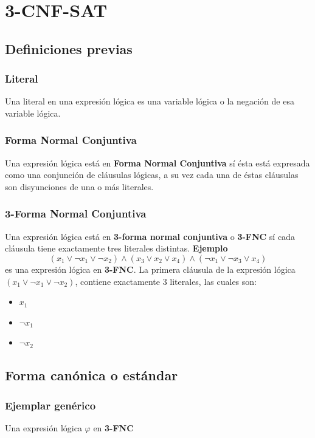 \documentclass[a4paper]{article}
\begin{document}
\section{3-CNF-SAT}
\subsection{Definiciones previas}
\subsubsection{Literal}
\noindent
Una literal en una expresión lógica es una variable lógica o la negación de esa variable lógica.
\subsubsection{Forma Normal Conjuntiva}
\noindent
Una expresión lógica está en \textbf{Forma Normal Conjuntiva} sí ésta está expresada como una 
conjunción de cláusulas lógicas, a su vez cada una de éstas cláusulas son disyunciones de una 
o más literales.
\subsubsection{3-Forma Normal Conjuntiva}
\noindent
Una expresión lógica está en \textbf{3-forma normal conjuntiva} o \textbf{3-FNC} sí cada cláusula tiene
exactamente tres literales distintas. 
\newline 
\textbf{Ejemplo}
\[
    \left(x_{1} \lor \neg x_{1} \lor \neg x_{2}\right) \land \left(x_{3} \lor x_{2} \lor x_{4}\right) \land \left(\neg x_{1} \lor \neg x_{3} \lor x_{4}\right)
\]
es una expresión lógica en \textbf{3-FNC}.
\newline 
La primera cláusula de la expresión lógica \(\left(x_{1} \lor \neg x_{1} \lor \neg x_{2}\right)\), contiene exactamente \(3\) literales, las 
cuales son:
\begin{itemize}
    \item \(x_{1}\)
    \item \(\neg x_{1}\)
    \item \(\neg x_{2}\)
\end{itemize}
\subsection{Forma canónica o estándar}
\subsubsection{Ejemplar genérico}
\noindent
Una expresión lógica \(\varphi\) en \textbf{3-FNC}
\end{document}
